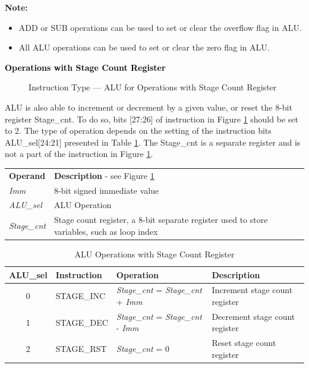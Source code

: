 \documentclass[main\_\_EN.tex]{subfiles}
\begin{document}
\textbf{Note:}
\begin{itemize}
    \item ADD or SUB operations can be used to set or clear the overflow flag in ALU.
    \item All ALU operations can be used to set or clear the zero flag in ALU.
\end{itemize}


\textcolor{black}{\bfseries Operations with Stage Count Register}
\label{section:StageCount}


%
%
%
%
%
%
%
\begin{figure}[!ht ]
    \centering
    \caption{Instruction Type — ALU for Operations with Stage Count Register}
    \label{figure:ALU-with-stage-count}
\end{figure}

ALU is also able to increment or decrement by a given value, or reset the 8-bit register Stage\_cnt. To do so, bits [27:26] of instruction in Figure \ref{figure:ALU-with-stage-count} should be set to 2. The type of operation depends on the setting of the instruction bits ALU\_sel[24:21] presented in Table  \ref{figure:ALU-with-stage-count}. The Stage\_cnt is a separate register and is not a part of the instruction in Figure \ref{figure:ALU-with-stage-count}.

\begin{tabular}{ l l }
\textbf{Operand} & \textbf{Description} - see Figure \ref{figure:ALU-with-stage-count} \\
\textit{Imm} & 8-bit signed immediate value\\
\textit{ALU\_sel} & ALU Operation \\
\textit{Stage\_cnt} & Stage count register, a 8-bit separate register used to store variables, such as loop index

\end{tabular}

\begin{table}[!ht ]
    \centering
    \begin{tabular}{ c l l l }
    \textbf{ALU\_sel} & \textbf{Instruction} & \textbf{Operation} & \textbf{Description} \\ \hline
    0 & STAGE\_INC & \textit{Stage\_cnt} = \textit{Stage\_cnt} + \textit{Imm} & Increment stage count register \\
    1 & STAGE\_DEC & \textit{Stage\_cnt} = \textit{Stage\_cnt} - \textit{Imm} & Decrement stage count register \\
    2 & STAGE\_RST & \textit{Stage\_cnt} = 0 & Reset stage count register
    \end{tabular}
    \caption{ALU Operations with Stage Count Register}
    \label{table:ALU-with-stage-count}
\end{table}
\end{document}
